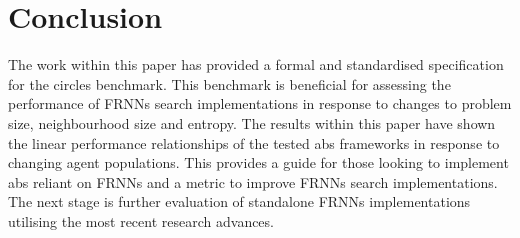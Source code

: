 \vspace{-0.3cm}
\section{Conclusion\label{sec:conclusion}}
\vspace{-0.4cm}
  The work within this paper has provided a formal and standardised specification for the circles benchmark. This benchmark is beneficial for assessing the performance of FRNNs search implementations in response to changes to problem size, neighbourhood size and entropy. The results within this paper have shown the linear performance relationships of the tested \gls{abs} frameworks in response to changing agent populations. This provides a guide for those looking to implement \gls{abs} reliant on FRNNs and a metric to improve FRNNs search implementations. The next stage is further evaluation of standalone FRNNs implementations utilising the most recent research advances.